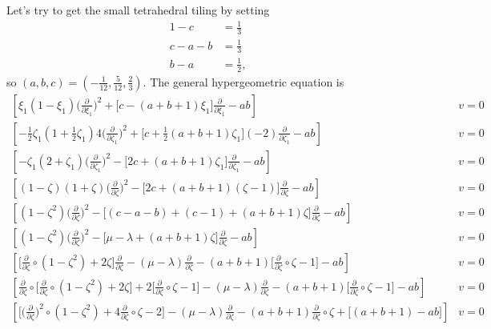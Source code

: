 \documentclass{article}
\theoremstyle{plain}
\begin{document}
\color{ForestGreen}
Let's try to get the small tetrahedral tiling by setting
\begin{align*}
1 - c & = \tfrac{1}{3} \\
c - a - b & = \tfrac{1}{3} \\
b - a & = \tfrac{1}{2},
\end{align*}
so $(a, b, c) = (-\tfrac{1}{12}, \tfrac{5}{12}, \tfrac{2}{3})$. The general hypergeometric equation is
\begin{align*}
\left[\xi_1 (1 - \xi_1) \big(\tfrac{\partial}{\partial \xi_1}\big)^2 + \big[c - (a+b+1)\xi_1\big] \tfrac{\partial}{\partial \xi_1} - ab\right] & v = 0 \\
\left[-\tfrac{1}{2}\zeta_1 (1 + \tfrac{1}{2}\zeta_1) 4 \big(\tfrac{\partial}{\partial \zeta_1}\big)^2 + \big[c + \tfrac{1}{2}(a+b+1)\zeta_1\big] (-2) \tfrac{\partial}{\partial \zeta_1} - ab\right] & v = 0 \\
\left[-\zeta_1 (2 + \zeta_1) \big(\tfrac{\partial}{\partial \zeta_1}\big)^2 - \big[2c + (a+b+1)\zeta_1\big] \tfrac{\partial}{\partial \zeta_1} - ab\right] & v = 0 \\
\left[(1 - \zeta)(1 + \zeta) \big(\tfrac{\partial}{\partial \zeta}\big)^2 - \big[2c + (a+b+1)(\zeta - 1)\big] \tfrac{\partial}{\partial \zeta} - ab\right] & v = 0 \\
\left[(1 - \zeta^2)\big(\tfrac{\partial}{\partial \zeta}\big)^2 - \big[(c - a - b) + (c - 1) + (a+b+1)\zeta\big] \tfrac{\partial}{\partial \zeta} - ab\right] & v = 0 \\
\left[(1 - \zeta^2)\big(\tfrac{\partial}{\partial \zeta}\big)^2 - \big[\mu - \lambda + (a+b+1)\zeta\big] \tfrac{\partial}{\partial \zeta} - ab\right] & v = 0 \\
\left[\big[\tfrac{\partial}{\partial \zeta} \circ (1 - \zeta^2) + 2\zeta\big] \tfrac{\partial}{\partial \zeta} - (\mu - \lambda) \tfrac{\partial}{\partial \zeta} - (a+b+1)\big[\tfrac{\partial}{\partial \zeta} \circ \zeta - 1\big] - ab\right] & v = 0 \\
\left[\tfrac{\partial}{\partial \zeta} \circ \big[ \tfrac{\partial}{\partial \zeta} \circ (1 - \zeta^2) + 2\zeta \big] + 2\big[\tfrac{\partial}{\partial \zeta} \circ \zeta - 1\big] - (\mu - \lambda) \tfrac{\partial}{\partial \zeta} - (a+b+1)\big[\tfrac{\partial}{\partial \zeta} \circ \zeta - 1\big] - ab\right] & v = 0 \\
\left[\big[ \big(\tfrac{\partial}{\partial \zeta}\big)^2 \circ (1 - \zeta^2) + 4 \tfrac{\partial}{\partial \zeta} \circ \zeta - 2 \big] - (\mu - \lambda) \tfrac{\partial}{\partial \zeta} - (a+b+1) \tfrac{\partial}{\partial \zeta} \circ \zeta + \big[ (a+b+1) - ab \big]\right] & v = 0 \\

\end{align*}
\end{document}
